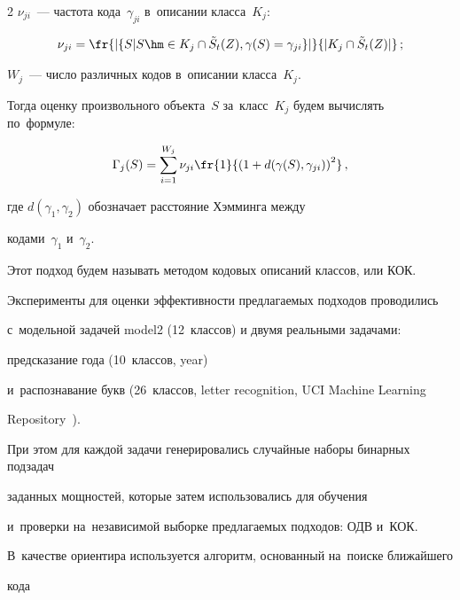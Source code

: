 \begin{multicols}{2}
 $\nu_{ji}$~--- час\-то\-та кода~$\gamma_{ji}$ в~описании класса~$K_j$: 


 $$


 \nu_{ji}=\fr{{|\{S|S\hm\in K_j\cap \tilde{S}_t(Z),


 \gamma(S)=\gamma_{ji}\}|}}{{|K_j\cap \tilde{S}_t(Z)|}}\,;


 $$


 $W_j$~--- число различных кодов в~описании класса~$K_j$.


Тогда оценку произвольного объекта~$S$ за~класс~$K_j$ будем вычислять по~формуле:


$$


\Gamma_j(S) = \sum\limits_{i=1}^{W_j}\nu_{ji}\fr{1}


{\left(1+d(\gamma(S),\gamma_{ji})\right)^2}\,,


$$


где $d(\gamma_1, \gamma_2)$ обозначает расстояние Хэмминга между 


кодами~$\gamma_1$ и~$\gamma_2$.











Этот подход будем называть методом кодовых описаний классов, или КОК.





Эксперименты для оценки эффективности предлагаемых подходов проводились


  с~модельной задачей model2 (12~классов) и двумя реальными задачами:


  предсказание года (10~классов, year)


  и~распознавание букв (26~классов, letter recognition, UCI Machine Learning 


  Repository~\cite{uci}).


При этом для каждой задачи генерировались случайные наборы бинарных подзадач 


заданных мощностей, которые затем использовались для обучения 


и~проверки на~независимой выборке предлагаемых подходов: ОДВ и~КОК.


В~качестве ориентира используется алгоритм, основанный на~поиске ближайшего


 кода\linebreak\vspace*{-12pt}



\end{multicols}
